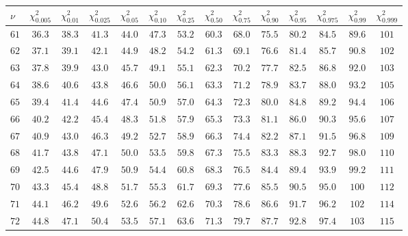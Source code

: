 
\begin{table}[htb!]
\begin{center}
{\scriptsize
\renewcommand\arraystretch{1.250000}
\begin{tabular}{p{22 pt}ccccccccccccc}
\hline

\rule[-2pt]{0pt}{14pt}$\nu$ & $\chi^2_{0.005}$ & $\chi^2_{0.01}$ & $\chi^2_{0.025}$ & $\chi^2_{0.05}$ & $\chi^2_{0.10}$ & $\chi^2_{0.25}$ & $\chi^2_{0.50}$ & $\chi^2_{0.75}$ & $\chi^2_{0.90}$ & $\chi^2_{0.95}$ & $\chi^2_{0.975}$ & $\chi^2_{0.99}$ & $\chi^2_{0.999}$\\
\hline
\hline
\rule[0pt]{0pt}{15pt}$61$ & $36.3$ & $38.3$ & $41.3$ & $44.0$ & $47.3$ & $53.2$ & $60.3$ & $68.0$ & $75.5$ & $80.2$ & $84.5$ & $89.6$ & $101$\\
$62$ & $37.1$ & $39.1$ & $42.1$ & $44.9$ & $48.2$ & $54.2$ & $61.3$ & $69.1$ & $76.6$ & $81.4$ & $85.7$ & $90.8$ & $102$\\
$63$ & $37.8$ & $39.9$ & $43.0$ & $45.7$ & $49.1$ & $55.1$ & $62.3$ & $70.2$ & $77.7$ & $82.5$ & $86.8$ & $92.0$ & $103$\\
$64$ & $38.6$ & $40.6$ & $43.8$ & $46.6$ & $50.0$ & $56.1$ & $63.3$ & $71.2$ & $78.9$ & $83.7$ & $88.0$ & $93.2$ & $105$\\
$65$ & $39.4$ & $41.4$ & $44.6$ & $47.4$ & $50.9$ & $57.0$ & $64.3$ & $72.3$ & $80.0$ & $84.8$ & $89.2$ & $94.4$ & $106$\\
$66$ & $40.2$ & $42.2$ & $45.4$ & $48.3$ & $51.8$ & $57.9$ & $65.3$ & $73.3$ & $81.1$ & $86.0$ & $90.3$ & $95.6$ & $107$\\
$67$ & $40.9$ & $43.0$ & $46.3$ & $49.2$ & $52.7$ & $58.9$ & $66.3$ & $74.4$ & $82.2$ & $87.1$ & $91.5$ & $96.8$ & $109$\\
$68$ & $41.7$ & $43.8$ & $47.1$ & $50.0$ & $53.5$ & $59.8$ & $67.3$ & $75.5$ & $83.3$ & $88.3$ & $92.7$ & $98.0$ & $110$\\
$69$ & $42.5$ & $44.6$ & $47.9$ & $50.9$ & $54.4$ & $60.8$ & $68.3$ & $76.5$ & $84.4$ & $89.4$ & $93.9$ & $99.2$ & $111$\\
$70$ & $43.3$ & $45.4$ & $48.8$ & $51.7$ & $55.3$ & $61.7$ & $69.3$ & $77.6$ & $85.5$ & $90.5$ & $95.0$ & $100$ & $112$\\
$71$ & $44.1$ & $46.2$ & $49.6$ & $52.6$ & $56.2$ & $62.6$ & $70.3$ & $78.6$ & $86.6$ & $91.7$ & $96.2$ & $102$ & $114$\\
$72$ & $44.8$ & $47.1$ & $50.4$ & $53.5$ & $57.1$ & $63.6$ & $71.3$ & $79.7$ & $87.7$ & $92.8$ & $97.4$ & $103$ & $115$\\

\end{tabular}}
\end{center}
\end{table}
